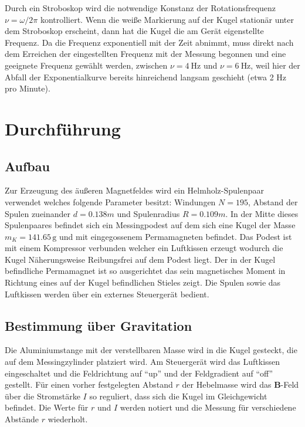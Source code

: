 \documentclass[
  bibliography=totoc,     %
  captions=tableheading,  %
  titlepage=firstiscover, %
]{scrartcl}
\begin{document}
  Durch ein Stroboskop wird die notwendige Konstanz der Rotationsfrequenz $\nu = \omega / 2 \pi$ kontrolliert.
  Wenn die weiße Markierung auf der Kugel stationär unter dem Stroboskop erscheint, dann hat die Kugel die am Gerät eigenstellte Frequenz.
  Da die Frequenz exponentiell mit der Zeit abnimmt, muss direkt nach dem Erreichen der eingestellten Frequenz mit der Messung begonnen und
  eine geeignete Frequenz gewählt werden, zwischen $\nu = \SI{4}{\Hz}$ und $\nu = \SI{6}{\Hz}$, weil hier der Abfall der Exponentialkurve bereits hinreichend langsam geschieht (etwa 2 Hz pro Minute).
  
  \section{Durchführung}
  \subsection{Aufbau}
    Zur Erzeugung des äußeren Magnetfeldes wird ein Helmholz-Spulenpaar verwendet welches folgende Parameter besitzt: Windungen $N=195$, 
    Abstand der Spulen zueinander $d=0.138m$ und Spulenradius $R=0.109m$. In der Mitte dieses Spulenpaares befindet sich ein Messingpodest auf dem sich
    eine Kugel der Masse $m_K = 141.65\,\si{\gram}$ und mit eingegossenem Permamagneten befindet. Das Podest ist mit einem Kompressor verbunden welcher ein Luftkissen erzeugt wodurch die Kugel 
    Näherungsweise Reibungsfrei auf dem Podest liegt. Der in der Kugel befindliche Permamagnet ist so ausgerichtet das sein magnetisches Moment in Richtung 
    eines auf der Kugel befindlichen Stieles zeigt. Die Spulen sowie das Luftkissen werden über ein externes Steuergerät bedient.
 
  \subsection{Bestimmung über Gravitation}
    Die Aluminiumstange mit der verstellbaren Masse wird in die Kugel gesteckt,
    die auf dem Messingzylinder platziert wird.
    Am Steuergerät wird das Luftkissen eingeschaltet und die Feldrichtung auf \enquote{up} und
    der Feldgradient auf \enquote{off} gestellt.
    Für einen vorher festgelegten Abstand $r$ der Hebelmasse wird das $\symbf{B}$-Feld über
    die Stromstärke $I$ so reguliert, dass sich die Kugel im Gleichgewicht befindet.
    Die Werte für $r$ und $I$ werden notiert und die Messung für verschiedene Abstände $r$ wiederholt.
    
\end{document}
